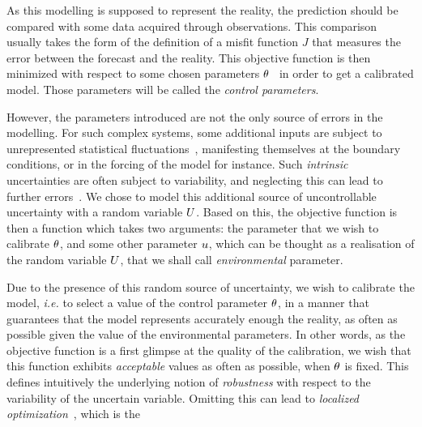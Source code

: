 \documentclass[../../Main_ManuscritThese.tex]{subfiles}
\begin{document}
As this modelling is supposed to represent the reality, the prediction
should be compared with some data acquired through observations. This
comparison usually takes the form of the definition of a misfit
function $J$ that measures the error between the forecast and the
reality. This objective function is then minimized with respect to
some chosen parameters
$\theta$~\cite{das_estimation_1991,das_variational_1992,boutet_estimation_2015}
in order to get a calibrated model. Those parameters will be called
the \emph{control parameters}.

However, the parameters introduced are not the only source of errors
in the modelling.  %
For such complex systems, some additional inputs are subject to
unrepresented statistical fluctuations~\cite{zanna_ocean_2011},
manifesting themselves at the boundary conditions, or in the forcing
of the model for instance. Such \emph{intrinsic} uncertainties are
often subject to variability, and neglecting this can lead to further
errors~\cite{mcwilliams_irreducible_2007}. We chose to model this additional
source of uncontrollable uncertainty with a random variable $U$.
Based on this, the objective function is then a function which takes
two arguments: the parameter that we wish to calibrate $\theta$, and some
other parameter $u$, which can be thought as a realisation of the random variable
$U$, that we shall call \emph{environmental} parameter.

Due to the presence of this random source of uncertainty, we wish to
calibrate the model, \emph{i.e.} to select a value of the control
parameter $\theta$, in a manner that guarantees that the model represents
accurately enough the reality, as often as possible given the value of
the environmental parameters. In other words, as the objective
function is a first glimpse at the quality of the calibration, we wish
that this function exhibits \emph{acceptable} values as often as
possible, when $\theta$ is fixed. This defines intuitively the underlying
notion of \emph{robustness} with respect to the variability of the
uncertain variable. Omitting this can lead to \emph{localized optimization}~\cite{huyse_probabilistic_2002}, which is the 
\end{document}
